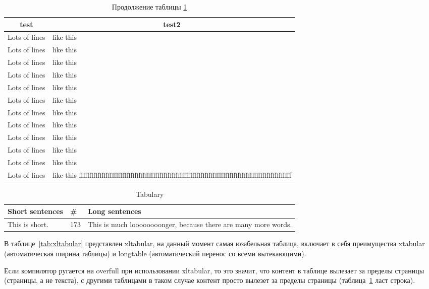 \begin{longtable}{|l|l|}
    \caption{Длинная таблица}\label{tab:long}\\\hline
    \multicolumn{1}{|c|}{\textbf{test}} & 
    \multicolumn{1}{c|}{\textbf{test2}} \\\hline 
\endfirsthead
    \caption*{Продолжение таблицы \ref{tab:long}}
\endhead
     Lots of lines & like this\\\hline
     Lots of lines & like this\\\hline
     Lots of lines & like this\\\hline
     Lots of lines & like this\\\hline
     Lots of lines & like this\\\hline
     Lots of lines & like this\\\hline
     Lots of lines & like this\\\hline
     Lots of lines & like this\\\hline
     Lots of lines & like this\\\hline
     Lots of lines & like this\\\hline
     Lots of lines & like this\\\hline
     Lots of lines & like this fffffffffffffffffffffffffffffffffffffffffffffffffffffffffffffffffffffffffffffffffffffffffffffffffffffff\\\hline
\end{longtable}

\begin{table}[H]
    \caption{Tabulary}\label{tab:y}
  \begin{tabulary}{\textwidth}{|L|L|L|}
  \hline
    Short sentences & \# & Long sentences \\\hline
    This is short. & 173 & This is much loooooooonger, because there are many more words. \\
    \hline
  \end{tabulary}
\end{table}

В таблице~\ref{tab:xltabular} представлен xltabular, на данный момент
самая юзабельная таблица, включает в себя преимущества xtabular (автоматическая ширина
таблицы)
и longtable (автоматический перенос со всеми вытекающими).

Если компилятор ругается на overfull при использовании xltabular, то это значит, что
контент в таблице вылезает за пределы страницы (страницы, а не текста), с другими таблицами
в таком случае контент просто вылезет за пределы страницы (таблица~\ref{tab:long} ласт строка).

